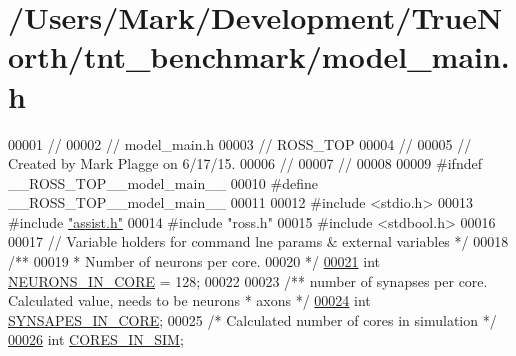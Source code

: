 \hypertarget{model__main_8h_source}{}\section{/\+Users/\+Mark/\+Development/\+True\+North/tnt\+\_\+benchmark/model\+\_\+main.h}

\begin{DoxyCode}
00001 \textcolor{comment}{//}
00002 \textcolor{comment}{//  model\_main.h}
00003 \textcolor{comment}{//  ROSS\_TOP}
00004 \textcolor{comment}{//}
00005 \textcolor{comment}{//  Created by Mark Plagge on 6/17/15.}
00006 \textcolor{comment}{//}
00007 \textcolor{comment}{//}
00008 
00009 \textcolor{preprocessor}{#}\textcolor{preprocessor}{ifndef} \textcolor{preprocessor}{\_\_ROSS\_TOP\_\_model\_main\_\_}
00010 \textcolor{preprocessor}{#}\textcolor{preprocessor}{define} \textcolor{preprocessor}{\_\_ROSS\_TOP\_\_model\_main\_\_}
00011 
00012 \textcolor{preprocessor}{#}\textcolor{preprocessor}{include} \textcolor{preprocessor}{<}\textcolor{preprocessor}{stdio}\textcolor{preprocessor}{.}\textcolor{preprocessor}{h}\textcolor{preprocessor}{>}
00013 \textcolor{preprocessor}{#}\textcolor{preprocessor}{include} \hyperlink{assist_8h}{"assist.h"}
00014 \textcolor{preprocessor}{#}\textcolor{preprocessor}{include} \textcolor{preprocessor}{"ross.h"}
00015 \textcolor{preprocessor}{#}\textcolor{preprocessor}{include} \textcolor{preprocessor}{<}\textcolor{preprocessor}{stdbool}\textcolor{preprocessor}{.}\textcolor{preprocessor}{h}\textcolor{preprocessor}{>}
00016 
00017     \textcolor{comment}{// Variable holders for command lne params & external variables */}
00018 \textcolor{comment}{/**}
00019 \textcolor{comment}{ *  Number of neurons per core.}
00020 \textcolor{comment}{ */}
\hypertarget{model__main_8h_source_l00021}{}\hyperlink{model__main_8h_a67e8e45768f76b984a60fcff2b7c51aa}{00021} \textcolor{keywordtype}{int} \hyperlink{model__main_8h_a67e8e45768f76b984a60fcff2b7c51aa}{NEURONS\_IN\_CORE} = 128;
00022 
00023 \textcolor{comment}{/** number of synapses per core. Calculated value, needs to be neurons * axons */}
\hypertarget{model__main_8h_source_l00024}{}\hyperlink{model__main_8h_adc924fa4a60574e27538b63daed224d2}{00024} \textcolor{keywordtype}{int} \hyperlink{model__main_8h_adc924fa4a60574e27538b63daed224d2}{SYNSAPES\_IN\_CORE};
00025 \textcolor{comment}{/* Calculated number of cores in simulation */}
\hypertarget{model__main_8h_source_l00026}{}\hyperlink{model__main_8h_a142b2655c5a899956164ef4e1c394fea}{00026} \textcolor{keywordtype}{int} \hyperlink{model__main_8h_a142b2655c5a899956164ef4e1c394fea}{CORES\_IN\_SIM};

\end{DoxyCode}
